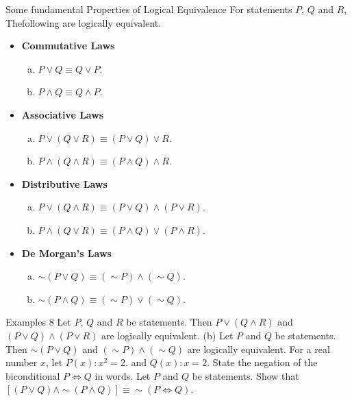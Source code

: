 \documentclass{beamer}
\begin{document}
\begin{frame}{Some fundamental Properties of Logical Equivalence}
For statements $P$, $Q$ and $R$, Thefollowing are logically equivalent.
\begin{itemize}
    \item \textbf{Commutative Laws}
    \begin{enumerate}[(a)]
        \item $P \lor Q \equiv Q \lor P$.
        \item $P \land Q \equiv Q \land P$.
    \end{enumerate}
    \item \textbf{Associative Laws}
    \begin{enumerate}[(a)]
        \item $P \lor (Q \lor R) \equiv (P \lor Q) \lor R$.
        \item $P \land (Q \land R) \equiv (P \land Q) \land R$.
    \end{enumerate}
    \item \textbf{Distributive Laws}
    \begin{enumerate}[(a)]
        \item $P \lor (Q \land R) \equiv (P \lor Q) \land (P \lor R)$.
        \item $P \land (Q \lor R) \equiv (P \land Q) \lor (P \land R)$.
    \end{enumerate}
    \item \textbf{De Morgan’s Laws}
    \begin{enumerate}[(a)]
        \item $\sim (P \lor Q) \equiv (\sim P) \land (\sim Q)$.
        \item $\sim (P \land Q) \equiv (\sim P) \lor (\sim Q)$.
    \end{enumerate}
\end{itemize}
\end{frame}

\begin{frame}{Examples 8}
Let $P$, $Q$ and $R$ be statements. Then $P \lor (Q \land R)$ and $(P \lor Q) \land (P \lor R)$ are logically equivalent.
(b) Let $P$ and $Q$ be statements. Then $\sim (P \lor Q)$ and $(\sim P) \land (\sim Q)$ are logically equivalent.
For a real number $x$, let $P(x): x^2 = 2$. and $Q(x): x=2$. State the negation of the biconditional $P \Leftrightarrow Q$ in words.
Let $P$ and $Q$ be statements. Show that $[(P \lor Q) \land \sim (P \land Q)] \equiv \sim (P \Leftrightarrow Q)$.
\end{frame}
\end{document}
